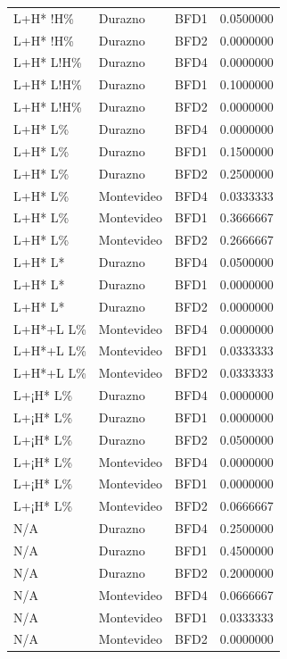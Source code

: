 \documentclass[
  man]{apa6}
\begin{document}
\begin{longtable}[]{@{}lllr@{}}
L+H* !H\% & Durazno & BFD1 & 0.0500000 \\
L+H* !H\% & Durazno & BFD2 & 0.0000000 \\
L+H* L!H\% & Durazno & BFD4 & 0.0000000 \\
L+H* L!H\% & Durazno & BFD1 & 0.1000000 \\
L+H* L!H\% & Durazno & BFD2 & 0.0000000 \\
L+H* L\% & Durazno & BFD4 & 0.0000000 \\
L+H* L\% & Durazno & BFD1 & 0.1500000 \\
L+H* L\% & Durazno & BFD2 & 0.2500000 \\
L+H* L\% & Montevideo & BFD4 & 0.0333333 \\
L+H* L\% & Montevideo & BFD1 & 0.3666667 \\
L+H* L\% & Montevideo & BFD2 & 0.2666667 \\
L+H* L* & Durazno & BFD4 & 0.0500000 \\
L+H* L* & Durazno & BFD1 & 0.0000000 \\
L+H* L* & Durazno & BFD2 & 0.0000000 \\
L+H*+L L\% & Montevideo & BFD4 & 0.0000000 \\
L+H*+L L\% & Montevideo & BFD1 & 0.0333333 \\
L+H*+L L\% & Montevideo & BFD2 & 0.0333333 \\
L+¡H* L\% & Durazno & BFD4 & 0.0000000 \\
L+¡H* L\% & Durazno & BFD1 & 0.0000000 \\
L+¡H* L\% & Durazno & BFD2 & 0.0500000 \\
L+¡H* L\% & Montevideo & BFD4 & 0.0000000 \\
L+¡H* L\% & Montevideo & BFD1 & 0.0000000 \\
L+¡H* L\% & Montevideo & BFD2 & 0.0666667 \\
N/A & Durazno & BFD4 & 0.2500000 \\
N/A & Durazno & BFD1 & 0.4500000 \\
N/A & Durazno & BFD2 & 0.2000000 \\
N/A & Montevideo & BFD4 & 0.0666667 \\
N/A & Montevideo & BFD1 & 0.0333333 \\
N/A & Montevideo & BFD2 & 0.0000000 \\
\end{longtable}
\end{document}
